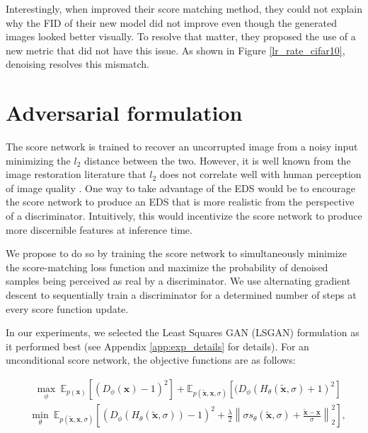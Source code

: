 \documentclass{article} \usepackage{iclr2021_conference_notitle,times}
\theoremstyle{definition}
\theoremstyle{definition}
\newcommand{\norm}[1]{\left\lVert#1\right\rVert}
\begin{document}
Interestingly, when \citet{song2020improved} improved their score matching method, they could not explain why the FID of their new model did not improve even though the generated images looked better visually. To resolve that matter, they proposed the use of a new metric \citep{zhou2019hype} that did not have this issue. As shown in Figure \ref{lr_rate_cifar10}, denoising resolves this mismatch.

\section{Adversarial formulation}\label{sec:adversarial}

The score network is trained to recover an uncorrupted image from a noisy input minimizing the $l_2$ distance between the two. However, it is well known from the image restoration literature that $l_2$ does not correlate well with human perception of image quality \citep{zhang2012comprehensive,zhao2016loss}.
One way to take advantage of the EDS would be to encourage the score network to produce an EDS that is more realistic from the perspective of a discriminator. 
Intuitively, this would incentivize the score network to produce more discernible features at inference time.

We propose to do so by training the score network to simultaneously minimize the score-matching loss function and maximize the probability of denoised samples being perceived as real by a discriminator. We use alternating gradient descent to sequentially train a discriminator for a determined number of steps at every score function update. 

In our experiments, we selected the Least Squares GAN (LSGAN) \citep{LSGAN} formulation as it performed best (see Appendix \ref{app:exp_details} for details). For an unconditional score network, the objective functions are as follows:

\begin{align}\label{eqn:GANmax}
&\max_{\phi} ~ \mathbb{E}_{p(\boldsymbol{x})}\left[ (D_\phi(\boldsymbol{x}) - 1)^2 \right] + \mathbb{E}_{p(\boldsymbol{\tilde{x}}, \boldsymbol{x}, \sigma)} \left[ (D_\phi(H_{\theta}(\boldsymbol{\tilde{x}},\sigma)+1)^2\right]
\end{align}
\begin{align}\label{eqn:GANmin}
&\min_{\theta} ~ \mathbb{E}_{p(\boldsymbol{\tilde{x}}, 
\boldsymbol{x}, \sigma)}\left[ (D_\phi(H_{\theta}(\boldsymbol{\tilde{x}},\sigma))-1)^2 + \frac{\lambda}{2} \norm{\sigma s_{\theta}(\boldsymbol{\tilde{x}},\sigma) + \frac{\boldsymbol{\tilde{x}} - \boldsymbol{x}}{\sigma}}_2^2 \right],
\end{align}
\end{document}
